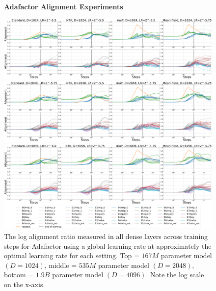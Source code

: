\documentclass{article}
\theoremstyle{plain}
\theoremstyle{definition}
\theoremstyle{remark}
\begin{document}
\begin{figure}[ht]
    \begin{center}
        \textbf{Adafactor Alignment Experiments}\\
        \figvspace
        
        \includegraphics[width=\linewidth, trim={0, 0, 0, 0},clip]{icml2024/figures/alignment/appendix/adafactor_ps_on_1024.pdf}
       
        \figvspace
        \figvspace
       
        \includegraphics[width=\linewidth, trim={0, 0, 0, 0},clip]{icml2024/figures/alignment/appendix/adafactor_ps_on_2048.pdf}
       
        \figvspace
        \figvspace
       
        \includegraphics[width=\linewidth, trim={0, 0, 0, 0},clip]{icml2024/figures/alignment/appendix/adafactor_ps_on_4096_legend.pdf}
        \caption{The log alignment ratio measured in all dense layers across training steps for Adafactor using a global learning rate at approximately the optimal learning rate for each setting. Top = $167M$ parameter model $(D=1024)$, middle = $535M$ parameter model $(D=2048)$, bottom = $1.9B$ parameter model $(D=4096)$. Note the log scale on the x-axis.}
        \label{fig:appendix_alignment_adafactor}
    \end{center}
\end{figure}
\clearpage
\end{document}

